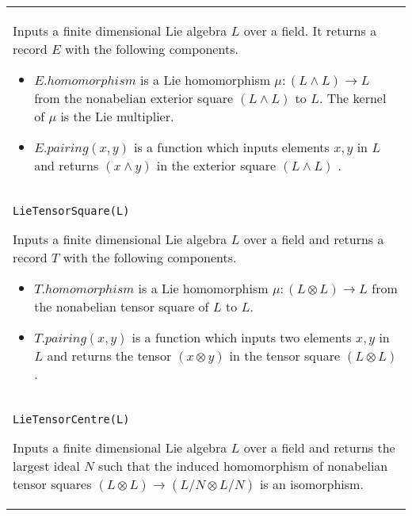 \documentclass[a4paper,11pt]{report}
\begin{document}
{\begin{center}
\begin{tabular}{|l|}
 Inputs a finite dimensional Lie algebra $L$ over a field. It returns a record $E$ with the following components. 
\begin{itemize}
\item  $E.homomorphism$ is a Lie homomorphism ${\ensuremath{\mu}} : (L \wedge L) \longrightarrow L$ from the nonabelian exterior square $(L \wedge L)$ to $L$. The kernel of ${\ensuremath{\mu}}$ is the Lie multiplier. 
\item  $E.pairing(x,y)$ is a function which inputs elements $x, y$ in $L$ and returns $(x \wedge y)$ in the exterior square $(L \wedge L)$ . 
\end{itemize}
 \\
 \index{LieTensorSquare} \texttt{LieTensorSquare(L) } 

 Inputs a finite dimensional Lie algebra $L$ over a field and returns a record $T$ with the following components. 
\begin{itemize}
\item  $T.homomorphism$ is a Lie homomorphism ${\ensuremath{\mu}} : (L \otimes L) \longrightarrow L$ from the nonabelian tensor square of $L$ to $L$. 
\item  $T.pairing(x,y)$ is a function which inputs two elements $x, y$ in $L$ and returns the tensor $(x \otimes y)$ in the tensor square $(L \otimes L)$ . 
\end{itemize}
 \\
 \index{LieTensorCentre} \texttt{LieTensorCentre(L) } 

 Inputs a finite dimensional Lie algebra $L$ over a field and returns the largest ideal $N$ such that the induced homomorphism of nonabelian tensor squares $(L \otimes L) \longrightarrow (L/N \otimes L/N)$ is an isomorphism. \\
\end{tabular}\\[2mm]
\end{center}

 }

 
\end{document}
